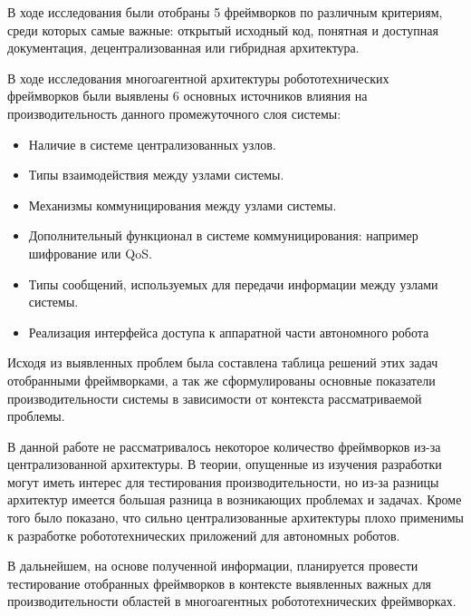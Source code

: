 В ходе исследования были отобраны 5 фреймворков по различным критериям, среди которых самые важные: открытый исходный код, понятная и доступная документация, децентрализованная или гибридная архитектура.

В ходе исследования многоагентной архитектуры робототехнических фреймворков были выявлены 6 основных источников влияния на производительность данного промежуточного слоя системы:

\begin{itemize}
	\item Наличие в системе централизованных узлов.
	\item Типы взаимодействия между узлами системы.
	\item Механизмы коммуницирования между узлами системы.
	\item Дополнительный функционал в системе коммуницирования: например шифрование или QoS.
	\item Типы сообщений, используемых для передачи информации между узлами системы.
	\item Реализация интерфейса доступа к аппаратной части автономного робота
\end{itemize}


Исходя из выявленных проблем была составлена таблица решений этих задач отобранными фреймворками, а так же сформулированы основные показатели производительности системы в зависимости от контекста рассматриваемой проблемы.

В данной работе не рассматривалось некоторое количество фреймворков из-за централизованной архитектуры. В теории, опущенные из изучения разработки могут иметь интерес для тестирования производительности, но из-за разницы архитектур имеется большая разница в возникающих проблемах и задачах. Кроме того было показано, что сильно централизованные архитектуры плохо применимы к разработке робототехнических приложений для автономных роботов.

В дальнейшем, на основе полученной информации, планируется провести тестирование отобранных фреймворков в контексте выявленных важных для производительности областей в многоагентных робототехнических фреймворках.